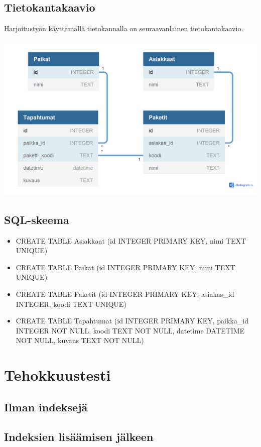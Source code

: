 \documentclass[12pt,a4paper]{article}
\begin{document}
\subsection*{Tietokantakaavio}
Harjoitustyön käyttämällä tietokannalla on seuraavanlainen tietokantakaavio.
\begin{center}

\includegraphics[width=1\textwidth]{TikapeKaavio.png} 
\end{center}
\subsection*{SQL-skeema}
\begin{itemize}
\item CREATE TABLE Asiakkaat (id INTEGER PRIMARY KEY, nimi TEXT UNIQUE)
\item CREATE TABLE Paikat (id INTEGER PRIMARY KEY, nimi TEXT UNIQUE)
\item CREATE TABLE Paketit (id INTEGER PRIMARY KEY, asiakas_id INTEGER, koodi TEXT UNIQUE)
\item CREATE TABLE Tapahtumat (id INTEGER PRIMARY KEY, paikka_id INTEGER NOT NULL, koodi TEXT NOT NULL, datetime DATETIME NOT NULL, kuvaus TEXT NOT NULL)
\end{itemize}



\newpage
\section{Tehokkuustesti}
\subsection*{Ilman indeksejä}
\subsection*{Indeksien lisäämisen jälkeen}
\end{document}
